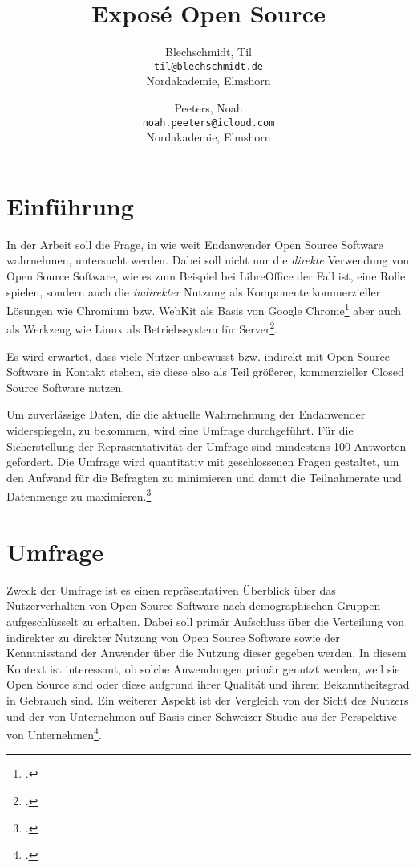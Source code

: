 \documentclass[a4paper]{article}
\title{Exposé Open Source}
\author{
  Blechschmidt, Til\\
  \texttt{til@blechschmidt.de}\\
  Nordakademie, Elmshorn
  \and
  Peeters, Noah\\
  \texttt{noah.peeters@icloud.com}\\
  Nordakademie, Elmshorn
}
\begin{document}
	\maketitle
	
	\section{Einführung}
		In der Arbeit soll die Frage, in wie weit Endanwender Open Source Software wahrnehmen, untersucht werden. Dabei soll nicht nur die \emph{direkte} Verwendung von Open Source Software, wie es zum Beispiel bei LibreOffice der Fall ist, eine Rolle spielen, sondern auch die \emph{indirekter} Nutzung als Komponente kommerzieller Lösungen wie Chromium bzw. WebKit als Basis von Google Chrome\footcite{is:open:source:right:for:you} aber auch als Werkzeug wie Linux als Betriebssystem für Server\footcite{report:BaselineScenario}.
		
		Es wird erwartet, dass viele Nutzer unbewusst bzw. indirekt mit Open Source Software in Kontakt stehen, sie diese also als Teil größerer, kommerzieller Closed Source Software nutzen.
		
		Um zuverlässige Daten, die die aktuelle Wahrnehmung der Endanwender widerspiegeln, zu bekommen, wird eine Umfrage durchgeführt. Für die Sicherstellung der Repräsentativität der Umfrage sind mindestens 100 Antworten gefordert. %
		Die Umfrage wird quantitativ mit geschlossenen Fragen gestaltet, um den Aufwand für die Befragten zu minimieren und damit die Teilnahmerate und Datenmenge zu maximieren.\footcite{handbuch:methoden}
	
	\section{Umfrage}
		Zweck der Umfrage ist es einen repräsentativen Überblick über das Nutzerverhalten von Open Source Software nach demographischen Gruppen aufgeschlüsselt zu erhalten. Dabei soll primär Aufschluss über die Verteilung von indirekter zu direkter Nutzung von Open Source Software sowie der Kenntnisstand der Anwender über die Nutzung dieser gegeben werden. In diesem Kontext ist interessant, ob solche Anwendungen primär genutzt werden, weil sie Open Source sind oder diese aufgrund ihrer Qualität und ihrem Bekanntheitsgrad in Gebrauch sind. Ein weiterer Aspekt ist der Vergleich von der Sicht des Nutzers und der von Unternehmen auf Basis einer Schweizer Studie aus der Perspektive von Unternehmen\footcite{oss:studie}.\\
	
\end{document}
